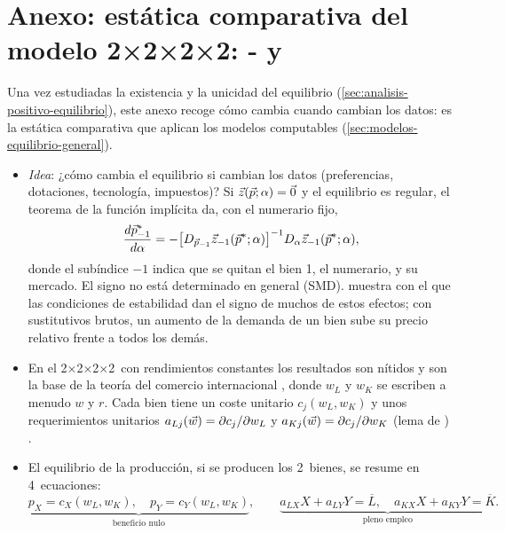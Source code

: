 \documentclass[11pt]{article}
\begin{document}
\section{Anexo: estática comparativa del modelo 2×2×2×2:\cortetitulo{} - y }\label{anexo:estatica}

Una vez estudiadas la existencia y la unicidad del equilibrio (\ref{sec:analisis-positivo-equilibrio}), este anexo recoge cómo cambia cuando cambian los datos: es la estática comparativa que aplican los modelos computables (\ref{sec:modelos-equilibrio-general}).

\begin{itemize}
\item \emph{Idea}: ¿cómo cambia el equilibrio si cambian los datos (preferencias, dotaciones, tecnología, impuestos)? Si $\vec{z}(\vec{p};\alpha)=\vec{0}$ y el equilibrio es regular, el teorema de la función implícita da, con el numerario fijo,
  \begin{equation}
  \frac{d\vec{p}^*_{-1}}{d\alpha}=-\big[D_{\vec{p}_{-1}}\vec{z}_{-1}(\vec{p}^*;\alpha)\big]^{-1}D_\alpha\vec{z}_{-1}(\vec{p}^*;\alpha),
  \end{equation}
  donde el subíndice $-1$ indica que se quitan el bien 1, el numerario, y su mercado. El signo no está determinado en general (SMD). \textcite{Samuelson1947Foundations} muestra con el  que las condiciones de estabilidad dan el signo de muchos de estos efectos; con sustitutivos brutos, un aumento de la demanda de un bien sube su precio relativo frente a todos los demás\nocite{MasColellWhinstonGreen1995}.
\item En el 2×2×2×2~con rendimientos constantes los resultados son nítidos y son la base de la teoría del comercio internacional , donde $w_L$ y $w_K$ se escriben a menudo $w$ y $r$. Cada bien tiene un coste unitario $c_j(w_L,w_K)$ y unos requerimientos unitarios $a_{Lj}(\vec{w})=\partial c_j/\partial w_L$ y $a_{Kj}(\vec{w})=\partial c_j/\partial w_K$ (lema de ) .
\item El equilibrio de la producción, si se producen los 2~bienes, se resume en 4~ecuaciones:
  \begin{equation}
  \underbrace{p_X=c_X(w_L,w_K),\quad p_Y=c_Y(w_L,w_K)}_{\text{beneficio nulo}},\qquad
  \underbrace{a_{LX}X+a_{LY}Y=\overline{L},\quad a_{KX}X+a_{KY}Y=\overline{K}}_{\text{pleno empleo}}.

\end{equation}
\end{itemize}
\end{document}
